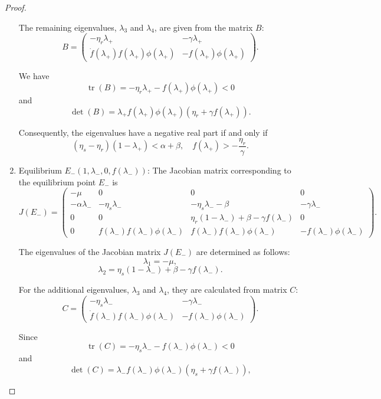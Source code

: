 \begin{proof}
\begin{enumerate}
		The remaining eigenvalues, \(\lambda_{3}\) and \(\lambda_{4}\), are given from the matrix \(B\):
		\[
		B = \begin{pmatrix}
			-\eta_{r}\lambda_{+} & -\gamma\lambda_{+} \\ 
			\dot{f}(\lambda_{+})f(\lambda_{+})\phi(\lambda_{+}) & -f(\lambda_{+})\phi(\lambda_{+})
		\end{pmatrix}.
		\]
		
		We have
		\[
		\operatorname{tr}(B) = -\eta_{r}\lambda_{+} - f(\lambda_{+})\phi(\lambda_{+}) < 0
		\]
		and
		\[
		\det(B) = \lambda_{+}f(\lambda_{+})\phi(\lambda_{+})(\eta_{r} + \gamma f(\lambda_{+})).
		\]
		
		Consequently, the eigenvalues have a negative real part if and only if
		\[
		(\eta_{s}-\eta_{r})(1-\lambda_{+}) < \alpha + \beta, \quad f(\lambda_{+}) > -\dfrac{\eta_{r}}{\gamma}.
		\] 
		
		
		\item Equilibrium \(E_{-}(1,\lambda_{-},0,f(\lambda_{-}))\): The Jacobian matrix corresponding to the equilibrium point \(E_{-}\) is
		\[
		J(E_{-}) = \begin{pmatrix}
			-\mu & 0 & 0 & 0 \\ 
			-\alpha\lambda_{-} & -\eta_{s}\lambda_{-} & -\eta_{s}\lambda_{-} - \beta & -\gamma\lambda_{-} \\ 
			0 & 0 & \eta_{r}(1-\lambda_{-}) + \beta - \gamma f(\lambda_{-}) & 0 \\ 
			0 & f(\lambda_{-})f(\lambda_{-})\phi(\lambda_{-}) & f(\lambda_{-})f(\lambda_{-})\phi(\lambda_{-}) & -f(\lambda_{-})\phi(\lambda_{-})
		\end{pmatrix}.
		\]
		
		The eigenvalues of the Jacobian matrix \(J(E_{-})\) are determined as follows:
		\[
		\lambda_{1} = -\mu,
		\]
		\[
		\lambda_{2} = \eta_{s}(1-\lambda_{-}) + \beta - \gamma f(\lambda_{-}).
		\]
		
		For the additional eigenvalues, \(\lambda_{3}\) and \(\lambda_{4}\), they are calculated from matrix \(C\):
		\[
		C = \begin{pmatrix}
			-\eta_{s}\lambda_{-} & -\gamma\lambda_{-} \\ 
			\dot{f}(\lambda_{-})f(\lambda_{-})\phi(\lambda_{-}) & -f(\lambda_{-})\phi(\lambda_{-})
		\end{pmatrix}.
	\]

Since
\[
\operatorname{tr}(C) = -\eta_{s}\lambda_{-} - f(\lambda_{-})\phi(\lambda_{-}) < 0
\]
and
\[
\det(C) = \lambda_{-}f(\lambda_{-})\phi(\lambda_{-})(\eta_{s} + \gamma f(\lambda_{-})),
\]


\end{enumerate}
\end{proof}
